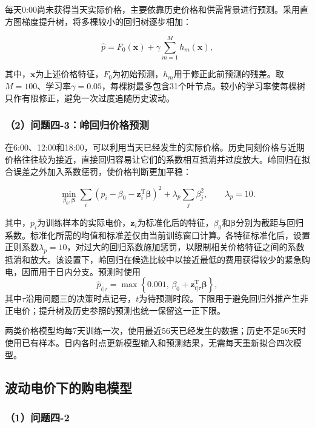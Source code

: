 每天0:00尚未获得当天实际价格，主要依靠历史价格和供需背景进行预测。采用直方图梯度提升树，将多棵较小的回归树逐步相加：

\begin{equation}
\hat{p}
=
F_0(\mathbf{x})
+
\gamma
\sum_{m=1}^{M}
h_m(\mathbf{x}),
\end{equation}

其中，$\mathbf{x}$为上述价格特征，$F_0$为初始预测，$h_m$用于修正此前预测的残差。取$M=100$、学习率$\gamma=0.05$，每棵树最多包含31个叶节点。较小的学习率使每棵树只作有限修正，避免一次过度追随历史波动。

\subsubsection*{（2）问题四-3：岭回归价格预测}

在6:00、12:00和18:00，可以利用当天已经发生的实际价格。历史同刻价格与近期价格往往较为接近，直接回归容易让它们的系数相互抵消并过度放大。岭回归在拟合误差之外加入系数惩罚，使价格判断更加平稳：

\begin{equation}
\min_{\beta_0,\boldsymbol{\beta}}
\sum_i
\left(
p_i-\beta_0-\mathbf{z}_i^{\mathrm T}\boldsymbol{\beta}
\right)^2
+
\lambda_p
\sum_j\beta_j^2,
\qquad
\lambda_p=10.
\end{equation}

其中，$p_i$为训练样本的实际电价，$\mathbf{z}_i$为标准化后的特征，$\beta_0$和$\boldsymbol{\beta}$分别为截距与回归系数。标准化所需的均值和标准差仅由当前训练窗口计算。各特征标准化后，设置正则系数$\lambda_p=10$，对过大的回归系数施加惩罚，以限制相关价格特征之间的系数抵消和放大。该设置下，岭回归在候选比较中以接近最低的费用获得较少的紧急购电，因而用于日内分支。预测时使用
\begin{equation}
\hat p_{t|\tau}=\max\left\{0.001,\,\beta_0+\mathbf{z}_{t|\tau}^{\mathrm T}\boldsymbol{\beta}\right\},
\end{equation}
其中$\tau$沿用问题三的决策时点记号，$t$为待预测时段。下限用于避免回归外推产生非正电价；提升树及历史参照的预测也统一保留这一正下限。

两类价格模型均每7天训练一次，使用最近56天已经发生的数据；历史不足56天时使用已有样本。日内各时点更新模型输入和预测结果，无需每天重新拟合四次模型。

\subsection{波动电价下的购电模型}

\subsubsection*{（1）问题四-2}

